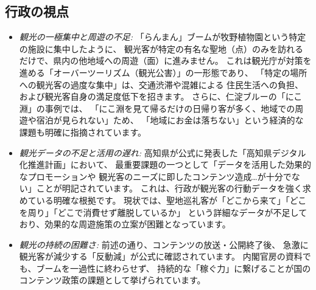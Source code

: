 \documentclass{docs}
\begin{document}
\subsection{行政の視点}
\begin{itemize}
\item \emph{観光の一極集中と周遊の不足:}
	「らんまん」ブームが牧野植物園という特定の施設に集中したように、
	観光客が特定の有名な聖地（点）のみを訪れるだけで、県内の他地域への周遊（面）に進みません。
	これは観光庁が対策を進める「オーバーツーリズム（観光公害）」の一形態\cite{kanko_overtourism}であり、
	「特定の場所への観光客の過度な集中」は、交通渋滞や混雑による
	住民生活への負担、および観光客自身の満足度低下を招きます。
	さらに、仁淀ブルーの「にこ淵」の事例\cite{nikobuchi_mlit}では、
	「にこ淵を見て帰るだけの日帰り客が多く、地域での周遊や宿泊が見られない」ため、
	「地域にお金は落ちない」という経済的な課題も明確に指摘されています。

	\item \emph{観光データの不足と活用の遅れ:}
	高知県が公式に発表した「高知県デジタル化推進計画」\cite{kochi_dx_plan}において、
	最重要課題の一つとして「データを活用した効果的なプロモーションや
	観光客のニーズに即したコンテンツ造成…が十分でない」ことが明記されています。
	これは、行政が観光客の行動データを強く求めている明確な根拠です。
	現状では、聖地巡礼客が「どこから来て」「どこを周り」「どこで消費せず離脱しているか」
	という詳細なデータが不足しており、効果的な周遊施策の立案が困難となっています。

	\item \emph{観光の持続の困難さ:}
	前述の通り、コンテンツの放送・公開終了後、
	急激に観光客が減少する「反動減」が公式に確認されています\cite{kochi_r7_plan}。
	内閣官房の資料\cite{cas_kadokawa}でも、ブームを一過性に終わらせず、
	持続的な「稼ぐ力」に繋げることが国のコンテンツ政策の課題として挙げられています。
\end{itemize}
\end{document}
